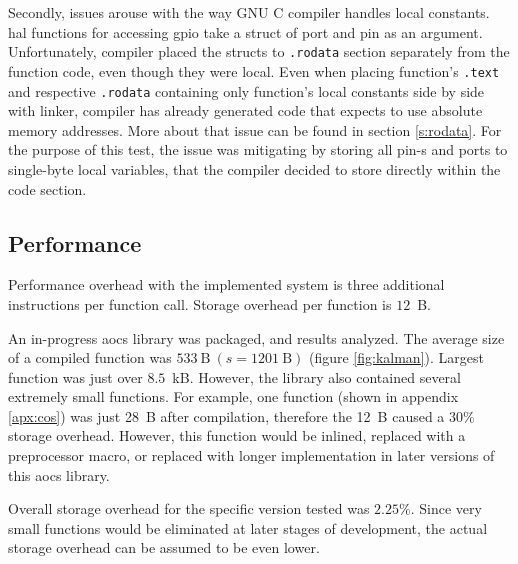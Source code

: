 Secondly, issues arouse with the way GNU C compiler handles local constants. \Gls{hal} functions for accessing \gls{gpio} take a struct of port and pin as an argument. Unfortunately, compiler placed the structs to \texttt{.rodata} section separately from the function code, even though they were local. Even when placing function's \texttt{.text} and respective \texttt{.rodata} containing only function's local constants side by side with linker, compiler has already generated code that expects to use absolute memory addresses. More about that issue can be found in section \ref{s:rodata}. For the purpose of this test, the issue was mitigating by storing all pin-s and ports to single-byte local variables, that the compiler decided to store directly within the code section.

\subsection{Performance}

Performance overhead with the implemented system is three additional instructions per function call. Storage overhead per function is $12$~B.

An in-progress \gls{aocs} library was packaged, and results analyzed. The average size of a compiled function was $533~\text{B}\ (s=1201~\text{B})$ (figure \ref{fig:kalman}). Largest function was just over $8.5$~kB. However, the library also contained several extremely small functions. For example, one function (shown in appendix \ref{apx:cos}) was just 28~B after compilation, therefore the 12~B caused a $30\%$ storage overhead. However, this function would be inlined, replaced with a preprocessor macro, or replaced with longer implementation in later versions of this \gls{aocs} library.

Overall storage overhead for the specific version tested was $2.25\%$. Since very small functions would be eliminated at later stages of development, the actual storage overhead can be assumed to be even lower.


